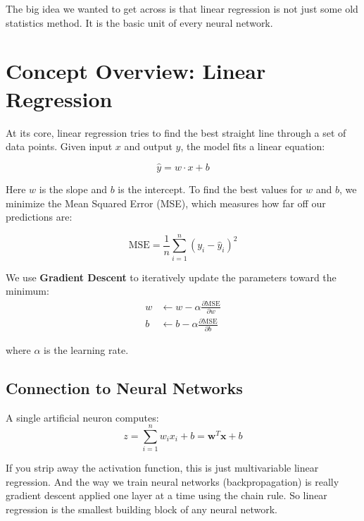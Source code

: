 \documentclass[12pt, a4paper]{article}
\begin{document}
The big idea we wanted to get across is that linear regression is not just some old statistics method. It is the basic unit of every neural network.

\section{Concept Overview: Linear Regression}
\label{sec:concept}

At its core, linear regression tries to find the best straight line through a set of data points. Given input $x$ and output $y$, the model fits a linear equation:

\begin{equation}
    \hat{y} = w \cdot x + b
\end{equation}

Here $w$ is the slope and $b$ is the intercept. To find the best values for $w$ and $b$, we minimize the Mean Squared Error (MSE), which measures how far off our predictions are:

\begin{equation}
    \text{MSE} = \frac{1}{n} \sum_{i=1}^{n} (y_i - \hat{y}_i)^2
\end{equation}

We use \textbf{Gradient Descent} to iteratively update the parameters toward the minimum:
\begin{align}
    w &\leftarrow w - \alpha \frac{\partial \text{MSE}}{\partial w} \\
    b &\leftarrow b - \alpha \frac{\partial \text{MSE}}{\partial b}
\end{align}

where $\alpha$ is the learning rate.

\subsection{Connection to Neural Networks}

A single artificial neuron computes:
\begin{equation}
    z = \sum_{i=1}^{n} w_i x_i + b = \mathbf{w}^T \mathbf{x} + b
\end{equation}

If you strip away the activation function, this is just multivariable linear regression. And the way we train neural networks (backpropagation) is really gradient descent applied one layer at a time using the chain rule. So linear regression is the smallest building block of any neural network.
\end{document}
